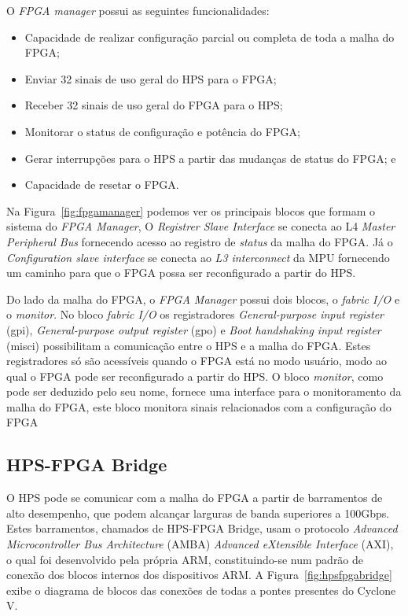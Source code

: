 O \textit{FPGA manager} possui as seguintes funcionalidades:

\begin{itemize}
    \item Capacidade de realizar configuração parcial ou completa de toda a malha do FPGA\@;
    \item Enviar 32 sinais de uso geral  do HPS para o FPGA\@;
    \item Receber 32 sinais de uso geral do FPGA para o HPS\@;
    \item Monitorar o status de configuração e potência do FPGA\@;
    \item Gerar interrupções para o HPS a partir das mudanças de status do FPGA\@; e
    \item Capacidade de resetar o FPGA\@.
\end{itemize}

Na Figura~\ref{fig:fpgamanager} podemos ver os principais blocos que formam o sistema do \textit{FPGA Manager}, O \textit{Registrer Slave Interface} se conecta ao L4 \textit{Master Peripheral Bus} fornecendo acesso ao registro de \textit{status} da malha do FPGA\@. Já o \textit{Configuration slave interface} se conecta ao \textit{L3 interconnect} da MPU fornecendo um caminho para que o FPGA possa ser reconfigurado a partir do HPS\@.

Do lado da malha do FPGA, o \textit{FPGA Manager} possui dois blocos, o \textit{fabric I/O} e o \textit{monitor}. No bloco \textit{fabric I/O} os registradores \textit{General-purpose input register} (gpi), \textit{General-purpose output register} (gpo) e \textit{Boot handshaking input register} (misci) possibilitam a comunicação entre o HPS e a malha do FPGA\@. Estes registradores só são acessíveis quando o FPGA está no modo usuário, modo ao qual o FPGA pode ser reconfigurado a partir do HPS\@. O bloco \textit{monitor}, como pode ser deduzido pelo seu nome, fornece uma interface para o monitoramento da malha do FPGA, este bloco monitora sinais relacionados com a configuração do FPGA 


\subsection{HPS-FPGA Bridge}
O HPS pode se comunicar com a malha do FPGA a partir de barramentos de alto desempenho, que podem alcançar larguras de banda superiores a 100Gbps. Estes barramentos, chamados de HPS-FPGA Bridge, usam o protocolo \textit{Advanced Microcontroller Bus Architecture} (AMBA) \textit{Advanced eXtensible Interface} (AXI), o qual foi desenvolvido pela própria ARM, constituindo-se num padrão de conexão dos blocos internos dos dispositivos ARM\@. A Figura~\ref{fig:hpsfpgabridge} exibe o diagrama de blocos das conexões de todas a pontes presentes do Cyclone V.

